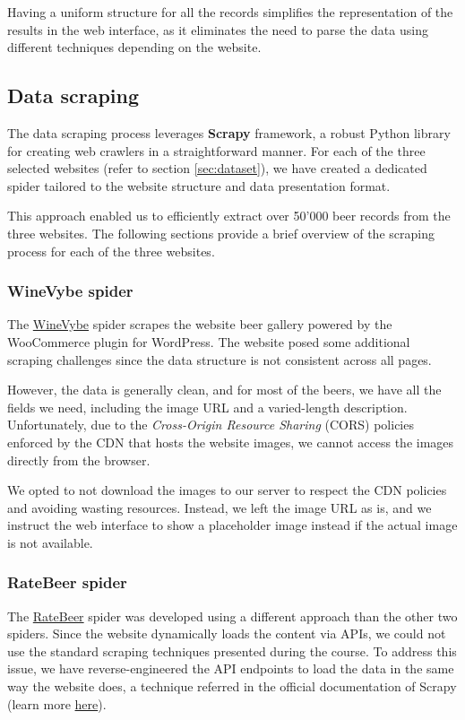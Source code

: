 Having a uniform structure for all the records simplifies the representation of the results in the web interface, as it eliminates the need to parse the data using different techniques depending on the website.

\subsection{Data scraping}
\label{sec:data-scraping}

The data scraping process leverages \textbf{Scrapy} framework, a robust Python library for creating web crawlers in a straightforward manner. For each of the three selected websites (refer to section \ref{sec:dataset}), we have created a dedicated spider tailored to the website structure and data presentation format.

This approach enabled us to efficiently extract over 50'000 beer records from the three websites. The following sections provide a brief overview of the scraping process for each of the three websites.

\subsubsection{WineVybe spider}

The \href{https://winevybe.com/}{WineVybe} spider scrapes the website beer gallery powered by the WooCommerce plugin for WordPress. The website posed some additional scraping challenges since the data structure is not consistent across all pages.

However, the data is generally clean, and for most of the beers, we have all the fields we need, including the image URL and a varied-length description. Unfortunately, due to the \textit{Cross-Origin Resource Sharing} (CORS) policies enforced by the CDN that hosts the website images, we cannot access the images directly from the browser.

We opted to not download the images to our server to respect the CDN policies and avoiding wasting resources. Instead, we left the image URL as is, and we instruct the web interface to show a placeholder image instead if the actual image is not available.

\subsubsection{RateBeer spider}

The \href{https://www.ratebeer.com/}{RateBeer} spider was developed using a different approach than the other two spiders. Since the website dynamically loads the content via APIs, we could not use the standard scraping techniques presented during the course. To address this issue, we have reverse-engineered the API endpoints to load the data in the same way the website does, a technique referred in the official documentation of Scrapy (learn more \href{https://docs.scrapy.org/en/latest/topics/dynamic-content.html}{here}).

